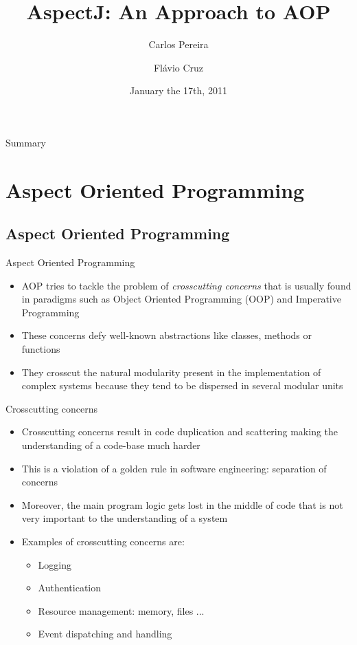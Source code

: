 \documentclass[11pt]{beamer}
\title{AspectJ: An Approach to AOP}
\author{Carlos Pereira \and Flávio Cruz}
\date{January the 17th, 2011}
\institute[Source Code Analysis and Manipulation]{Source Code Analysis and Manipulation}
\begin{document}

\frame{\titlepage}

\section[Summary]{}
\subsection*{}
\begin{frame}{Summary}
  \tableofcontents
\end{frame}

\section{Aspect Oriented Programming}
\subsection*{Aspect Oriented Programming}

\begin{frame}{Aspect Oriented Programming}
\begin{itemize}
\item AOP tries to tackle the problem of \emph{crosscutting concerns}  that is usually found in paradigms such as Object Oriented Programming (OOP) and Imperative Programming
\item These concerns defy well-known abstractions like classes, methods or functions
\item They crosscut the natural modularity present in the implementation of complex systems because they tend to be dispersed in several modular units
\end{itemize}
\end{frame}

\begin{frame}{Crosscutting concerns}
\begin{itemize}
   \item Crosscutting concerns result in code duplication and scattering making the understanding of a code-base much harder
   \item This is a violation of a golden rule in software engineering: separation of concerns
   \item Moreover, the main program logic gets lost in the middle of code that is not very important to the understanding of a system
   \item Examples of crosscutting concerns are:
      \begin{itemize}
         \item Logging
         \item Authentication
         \item Resource management: memory, files ...
         \item Event dispatching and handling
      \end{itemize}
\end{itemize}
\end{frame}
\end{document}
